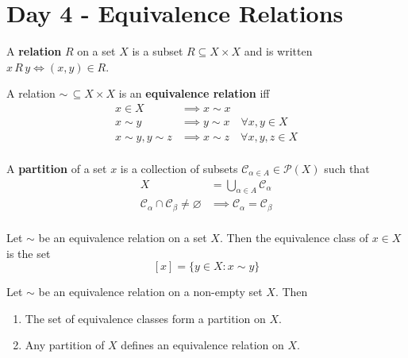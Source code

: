 \section{Day 4 - Equivalence Relations}

\begin{df}
A \textbf{relation} $R$ on a set $X$ is a subset $R \subseteq X \times
X$ and is written $x \, R \, y \Leftrightarrow (x, y) \in R$.
\end{df}

\begin{df}
A relation $\sim \, \subseteq X \times X$ is an \textbf{equivalence
relation} iff
\[ \begin{aligned}
x \in X &\implies x \sim x \\
x \sim y &\implies y \sim x \quad \forall x, y \in X \\
x \sim y, y \sim z &\implies x \sim z \quad \forall x, y, z \in X \\
\end{aligned} \]
\end{df}

\begin{df}
A \textbf{partition} of a set $x$ is a collection of subsets
$\mathcal{C}_{\alpha \in A} \in \mathcal{P}(X)$ such that
\[ \begin{aligned}
X &= \bigcup_{\alpha \in A} \mathcal{C}_\alpha \\
\mathcal{C}_\alpha \cap \mathcal{C}_\beta \neq \varnothing &\implies
\mathcal{C}_\alpha = \mathcal{C}_\beta \\
\end{aligned} \]
\end{df}

\begin{df}
Let $\sim$ be an equivalence relation on a set $X$. Then the equivalence
class of $x \in X$ is the set
\[ [x] = \lbrace y \in X : x \sim y \rbrace \]
\end{df}

\begin{thm}
\label{eqpart}
Let $\sim$ be an equivalence relation on a non-empty set $X$. Then
\begin{enumerate}
\item The set of equivalence classes form a partition on $X$.
\item Any partition of $X$ defines an equivalence relation on $X$.
\end{enumerate}
\end{thm}

